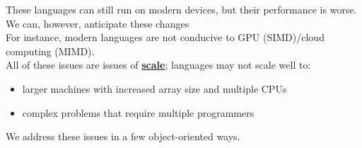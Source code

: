 \documentclass[../../lecture_notes.tex]{subfiles}
\begin{document}
These languages can still run on modern devices, but their performance is worse.\\
We can, however, anticipate these changes\\
\indent For instance, modern languages are not conducive to GPU (SIMD)/cloud computing (MIMD).\\
All of these issues are issues of \textbf{\underline{scale}}; languages may not scale well to:
	\begin{itemize} [itemsep=0mm]
		\item larger machines with increased array size and multiple CPUs
		\item complex problems that require multiple programmers
	\end{itemize}
We address these issues in a few object-oriented ways.\\
\end{document}
